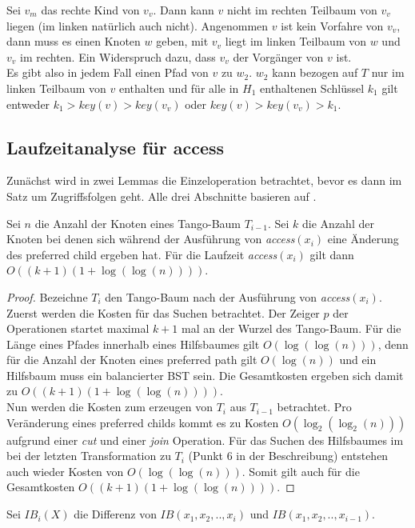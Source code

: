\documentclass[a4paper,12pt]{article}
\begin{document}
Sei $v_m$ das rechte Kind von $v_v$. Dann kann $v$ nicht im rechten Teilbaum von $v_v$ liegen (im linken natürlich auch nicht). Angenommen $v$ ist kein Vorfahre von $v_v$, dann muss es einen Knoten $w$ geben, mit $v_v$ liegt im linken Teilbaum von $w$ und $v_v$ im rechten. Ein Widerspruch dazu, dass $v_v$ der Vorgänger von $v$ ist.\\
Es gibt also in jedem Fall einen Pfad von $v$ zu $w_2$. $w_2$ kann bezogen auf $T$ nur im linken Teilbaum von $v$ enthalten und für alle in $H_1$ enthaltenen Schlüssel $k_1$ gilt entweder $k_1 > \mathit{key}\left(v\right) > \mathit{key}\left(v_v\right) $ oder  $ \mathit{key}\left(v\right) > \mathit{key}\left(v_v\right) > k_1 $.


\subsection{Laufzeitanalyse für access}
Zunächst wird in zwei Lemmas die Einzeloperation betrachtet, bevor es dann im Satz um Zugriffsfolgen geht. Alle drei Abschnitte basieren auf \cite{demainDinamicOpti}.

 
\begin{Lemma} \label{demaineLemma4}
	Sei $n$ die Anzahl der Knoten eines Tango-Baum $T_{i-1}$. Sei $k$ die Anzahl der Knoten bei denen sich während der Ausführung von \textit{access}$\left(x_i\right)$ eine Änderung des preferred child ergeben hat. Für die Laufzeit \textit{access}$\left(x_i\right)$ gilt dann $O\left(\left(k + 1\right) \left(1 + \log \left( \log  \left(n \right)\right)\right)\right)$.
\end{Lemma}
\begin{proof}
	Bezeichne $T_i$ den Tango-Baum nach der Ausführung von \textit{access}$\left(x_i\right)$. Zuerst werden die Kosten für das Suchen betrachtet. Der Zeiger $p$ der Operationen startet maximal $k + 1$ mal an der Wurzel des Tango-Baum. Für die Länge eines Pfades innerhalb eines Hilfsbaumes gilt $O\left(\log \left( \log  \left(n \right)\right)\right)$, denn für die Anzahl der Knoten eines preferred path gilt $O\left( \log \left(n\right)  \right)$ und ein Hilfsbaum muss ein balancierter BST sein. Die Gesamtkosten ergeben sich damit zu $O\left(\left(k + 1\right) \left(1 + \log \left( \log  \left(n \right)\right)\right)\right)$.\\
	Nun werden die Kosten zum erzeugen von $T_i$ aus $T_{i-1}$ betrachtet. Pro Veränderung eines preferred childs kommt es zu Kosten $O\left( \log_2\left(\log_2 \left(n\right)\right)\right)$ aufgrund einer \textit{cut} und einer \textit{join} Operation. Für das Suchen des Hilfsbaumes im bei der letzten Transformation zu $T_i$ (Punkt 6 in der Beschreibung) entstehen auch wieder Kosten von $O\left(\log \left( \log  \left(n \right)\right)\right)$. Somit gilt auch für die Gesamtkosten $O\left(\left(k + 1\right) \left(1 + \log \left( \log  \left(n \right)\right)\right)\right)$.
	
	
\end{proof}
\noindent Sei $\mathit{IB}_i\left(X\right)$ die Differenz von $\mathit{IB}\left(x_1, x_2,..,x_i\right)$ und  $\mathit{IB}\left(x_1, x_2,..,x_{i-1}\right)$. 
\end{document}
